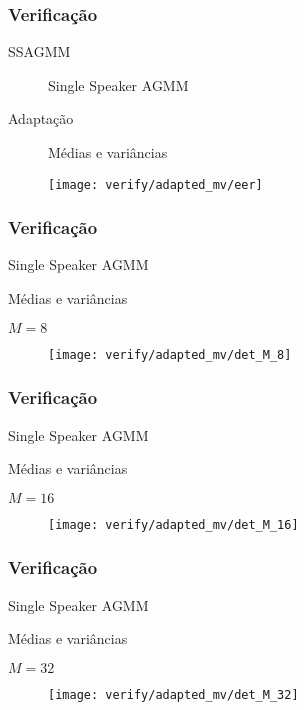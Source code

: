 \begin{frame}
\frametitle{Verificação}
\begin{description}
    \item[SSAGMM] Single Speaker AGMM
    \item[Adaptação] Médias e variâncias
\end{description}

\begin{figure}[ht]
    \centering
    \texttt{[image: verify/adapted\_mv/eer]}
\end{figure}
\end{frame}

\begin{frame}
\frametitle{Verificação}
\begin{description}
    \item[SSAGMM] Single Speaker AGMM
    \item[Adaptação] Médias e variâncias
    \item $M = 8$
\end{description}

\begin{figure}[ht]
    \centering
    \texttt{[image: verify/adapted\_mv/det\_M\_8]}
\end{figure}
\end{frame}

\begin{frame}
\frametitle{Verificação}
\begin{description}
    \item[SSAGMM] Single Speaker AGMM
    \item[Adaptação] Médias e variâncias
    \item $M = 16$
\end{description}

\begin{figure}[ht]
    \centering
    \texttt{[image: verify/adapted\_mv/det\_M\_16]}
\end{figure}
\end{frame}

\begin{frame}
\frametitle{Verificação}
\begin{description}
    \item[SSAGMM] Single Speaker AGMM
    \item[Adaptação] Médias e variâncias
    \item $M = 32$
\end{description}

\begin{figure}[ht]
    \centering
    \texttt{[image: verify/adapted\_mv/det\_M\_32]}
\end{figure}
\end{frame}

